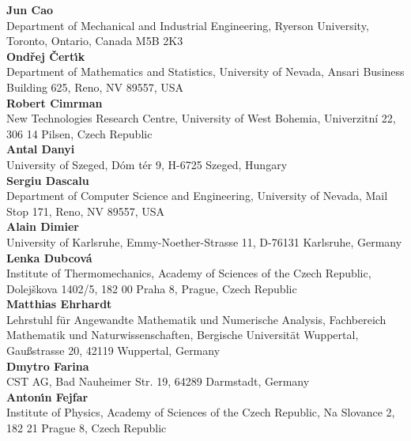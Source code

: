 \noindent
{\bf Jun Cao}\\
Department of Mechanical and Industrial Engineering,
Ryerson University,
Toronto, Ontario,
Canada M5B 2K3\\

\noindent
{\bf Ond\v rej \v Cert\'{\i}k}\\
Department of Mathematics and Statistics,
University of Nevada,
Ansari Business Building 625,
Reno,
NV 89557,
USA\\

\noindent
{\bf Robert Cimrman}\\
New Technologies Research Centre,
University of West Bohemia,
Univerzitn\'i 22,
306 14 Pilsen,
Czech Republic\\

\noindent
{\bf Antal Danyi}\\
University of Szeged,
D\'om t\'er 9,
H-6725 Szeged,
Hungary\\

\noindent
{\bf Sergiu Dascalu}\\
Department of Computer Science and Engineering,
University of Nevada,
Mail Stop 171,
Reno,
NV 89557,
USA\\

\noindent
{\bf Alain Dimier}\\
University of Karlsruhe,
Emmy-Noether-Strasse 11,
D-76131 Karlsruhe,
Germany\\

\noindent
{\bf Lenka Dubcov\'a}\\
Institute of Thermomechanics,
Academy of Sciences of the Czech Republic,
Dolej\v skova 1402/5,
182 00 Praha 8,
Prague,
Czech Republic\\

\noindent
{\bf Matthias Ehrhardt}\\
Lehrstuhl f\"ur Angewandte Mathematik und Numerische Analysis,
Fachbereich Mathematik und Naturwissenschaf\-ten,
Bergische Universit\"at Wuppertal,
Gau{\ss}strasse 20,
42119 Wuppertal,
Germany\\

\noindent
{\bf Dmytro Farina}\\
CST AG,
Bad Nauheimer Str. 19,
64289 Darmstadt,
Germany\\

\noindent
{\bf Anton\'{\i}n Fejfar}\\
Institute of Physics,
Academy of Sciences of the Czech Republic,
Na Slovance 2,
182 21 Prague 8,
Czech Republic\\

